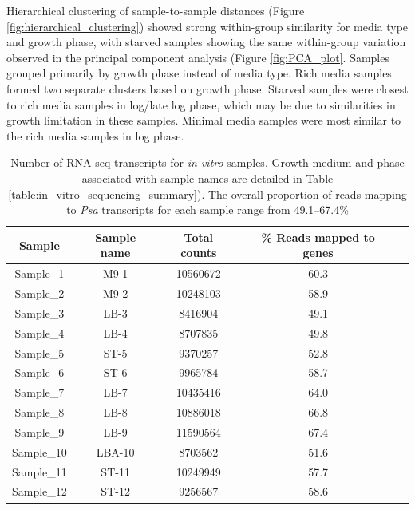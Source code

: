Hierarchical clustering of sample-to-sample distances (Figure \ref{fig:hierarchical_clustering}) showed strong within-group similarity for media type and growth phase, with starved samples showing the same within-group variation observed in the principal component analysis (Figure \ref{fig:PCA_plot}. Samples grouped primarily by growth phase instead of media type. Rich media samples formed two separate clusters based on growth phase. Starved samples were closest to rich media samples in log/late log phase, which may be due to similarities in growth limitation in these samples. Minimal media samples were most similar to the rich media samples in log phase. 
\begin{table}[H]
\footnotesize
    \centering
    \begin{minipage}{0.75\textwidth}
    \begin{tabular}{ccccc}\toprule
    Sample & Sample name & Total counts & \% Reads mapped to genes\\\midrule
Sample_1 & M9-1 & 10560672 & 60.3 \\
Sample_2 & M9-2 & 10248103 & 58.9 \\
Sample_3 & LB-3 & 8416904 & 49.1 \\
Sample_4 & LB-4 & 8707835 & 49.8 \\ 
Sample_5 & ST-5 & 9370257 & 52.8 \\
Sample_6 & ST-6 & 9965784 & 58.7 \\
Sample_7 & LB-7 & 10435416 & 64.0 \\
Sample_8 & LB-8 & 10886018 & 66.8 \\
Sample_9 & LB-9 & 11590564 & 67.4 \\
Sample_10 & LBA-10 & 8703562 & 51.6 \\ 
Sample_11 & ST-11 & 10249949 & 57.7 \\
Sample_12 & ST-12 & 9256567 & 58.6 \\
\bottomrule
    \end{tabular}
    \end{minipage}
    \begin{minipage}{0.24\textwidth}
        \caption[\textit{In vitro} read mapping statistics]{Number of RNA-seq transcripts for \textit{in vitro} samples. Growth medium and phase associated with sample names are detailed in Table \ref{table:in_vitro_sequencing_summary}). The overall proportion of reads mapping to \textit{Psa} transcripts for each sample range from 49.1--67.4\%}
    \label{tab:in_vitro_mapping}
    \end{minipage}
\end{table}
